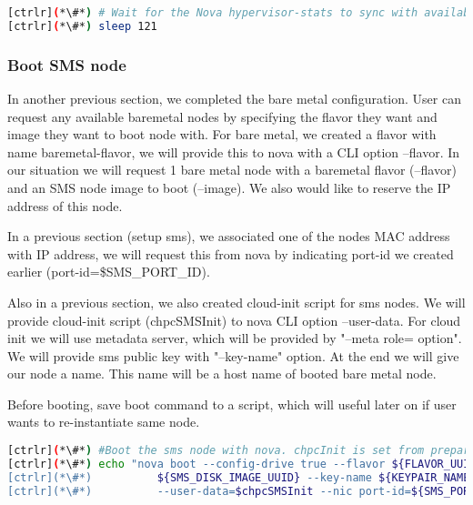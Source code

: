 
\begin{lstlisting}[language=bash,keywords={}]
[ctrlr](*\#*) # Wait for the Nova hypervisor-stats to sync with available Ironic resources
[ctrlr](*\#*) sleep 121
\end{lstlisting} 

\subsubsection{Boot SMS node}

	In another previous section, we completed the bare metal configuration. User can request any available baremetal nodes by specifying the flavor they want and image they want to boot node with. For bare metal, we created a flavor with name baremetal-flavor, we will provide this to nova with a CLI option --flavor. In our situation we will request 1 bare metal node with a baremetal flavor (--flavor) and an SMS node image to boot (--image).  We also would like to reserve the IP address of this node. 

	In a previous section (setup sms), we associated one of the nodes MAC address with IP address, we will request this from nova by indicating port-id we created earlier (port-id=\${SMS\_PORT\_ID}). 

	Also in a previous section, we also created cloud-init script for sms nodes. We will provide cloud-init script (chpcSMSInit) to nova CLI option --user-data. For cloud init we will use metadata server, which will be provided by "--meta role= option". We will provide sms public key with "--key-name" option. At the end we will give our node a name. This name will be a host name of booted bare metal node.

	Before booting, save boot command to a script, which will useful later on if user wants to re-instantiate same node.


\begin{lstlisting}[language=bash,keywords={}]
[ctrlr](*\#*) #Boot the sms node with nova. chpcInit is set from prepare_cloudInit
[ctrlr](*\#*) echo "nova boot --config-drive true --flavor ${FLAVOR_UUID} --image \
[ctrlr](*\#*)          ${SMS_DISK_IMAGE_UUID} --key-name ${KEYPAIR_NAME} --meta role=webservers \
[ctrlr](*\#*)          --user-data=$chpcSMSInit --nic port-id=${SMS_PORT_ID} ${sms_name}" > boot_sms
\end{lstlisting} 

